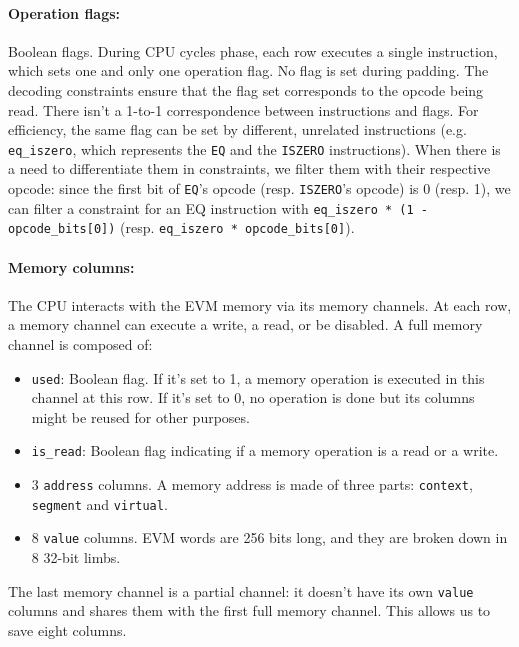 \paragraph*{Operation flags:} Boolean flags. During CPU cycles phase, each row executes a single instruction, which sets one and only one operation flag. No flag is set during
padding. The decoding constraints ensure that the flag set corresponds to the opcode being read.
There isn't a 1-to-1 correspondence between instructions and flags. For efficiency, the same flag can be set by different, unrelated instructions (e.g. \texttt{eq\_iszero}, which represents
the \texttt{EQ} and the \texttt{ISZERO} instructions). When there is a need to differentiate them in constraints, we filter them with their respective opcode: since the first bit of \texttt{EQ}'s opcode
(resp. \texttt{ISZERO}'s opcode) is 0 (resp. 1), we can filter a constraint for an EQ instruction with \texttt{eq\_iszero * (1 - opcode\_bits[0])}
(resp. \texttt{eq\_iszero * opcode\_bits[0]}).

\paragraph*{Memory columns:} The CPU interacts with the EVM memory via its memory channels. At each row, a memory channel can execute a write, a read, or be disabled. A full memory channel is composed of:
\begin{itemize}
    \item  \texttt{used}: Boolean flag. If it's set to 1, a memory operation is executed in this channel at this row. If it's set to 0, no operation is done but its columns might be reused for other purposes.
    \item  \texttt{is\_read}: Boolean flag indicating if a memory operation is a read or a write.
    \item  3 \texttt{address} columns. A memory address is made of three parts: \texttt{context}, \texttt{segment} and \texttt{virtual}.
    \item  8 \texttt{value} columns. EVM words are 256 bits long, and they are broken down in 8 32-bit limbs.
\end{itemize}
The last memory channel is a partial channel: it doesn't have its own \texttt{value} columns and shares them with the first full memory channel. This allows us to save eight columns.

